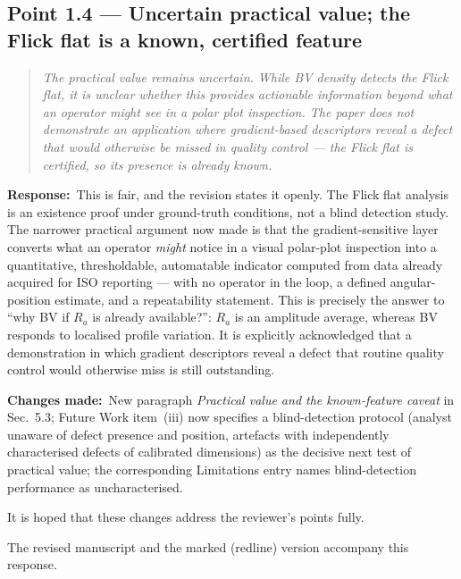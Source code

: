 \documentclass[11pt,a4paper]{article}
\newenvironment{reviewercomment}%
{\par\medskip\noindent\begin{quotation}\itshape\color{black!70}}%
{\end{quotation}\medskip}
\newcommand{\response}{\par\noindent\textbf{Response:}\ }
\newcommand{\changes}{\par\noindent\textbf{Changes made:}\ }
\begin{document}
\subsection*{Point 1.4 --- Uncertain practical value; the Flick flat is a known, certified feature}
\begin{reviewercomment}
The practical value remains uncertain. While BV density detects the Flick flat, it is unclear whether this provides actionable information beyond what an operator might see in a polar plot inspection. The paper does not demonstrate an application where gradient-based descriptors reveal a defect that would otherwise be missed in quality control --- the Flick flat is certified, so its presence is already known.
\end{reviewercomment}
\response This is fair, and the revision states it openly. The Flick flat analysis is an existence proof under ground-truth conditions, not a blind detection study. The narrower practical argument now made is that the gradient-sensitive layer converts what an operator \emph{might} notice in a visual polar-plot inspection into a quantitative, thresholdable, automatable indicator computed from data already acquired for ISO reporting --- with no operator in the loop, a defined angular-position estimate, and a repeatability statement. This is precisely the answer to ``why BV if $R_a$ is already available?'': $R_a$ is an amplitude average, whereas BV responds to localised profile variation. It is explicitly acknowledged that a demonstration in which gradient descriptors reveal a defect that routine quality control would otherwise miss is still outstanding.
\changes New paragraph \emph{Practical value and the known-feature caveat} in Sec.~5.3; Future Work item~(iii) now specifies a blind-detection protocol (analyst unaware of defect presence and position, artefacts with independently characterised defects of calibrated dimensions) as the decisive next test of practical value; the corresponding Limitations entry names blind-detection performance as uncharacterised.

\bigskip
It is hoped that these changes address the reviewer's points fully.

\bigskip
The revised manuscript and the marked (redline) version accompany this response.
\end{document}
